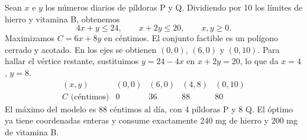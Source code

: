 Sean $x$ e $y$ los números diarios de píldoras P y Q. Dividiendo por 10 los límites de hierro y vitamina B, obtenemos
\[
 4x+y\le24,\qquad x+2y\le20,\qquad x,y\ge0.
\]
Maximizamos $C=6x+8y$ en céntimos. El conjunto factible es un polígono cerrado y acotado. En los ejes se obtienen $(0,0)$, $(6,0)$ y $(0,10)$. Para hallar el vértice restante, sustituimos $y=24-4x$ en $x+2y=20$, lo que da $x=4$, $y=8$.
\[
 \begin{array}{c|rrrr}
 (x,y)&(0,0)&(6,0)&(4,8)&(0,10)\\
 C\text{ (céntimos)}&0&36&88&80
 \end{array}
\]
El máximo del modelo es $\boxed{88\text{ céntimos al día}}$, con 4 píldoras P y 8 Q. El óptimo ya tiene coordenadas enteras y consume exactamente 240 mg de hierro y 200 mg de vitamina B.
